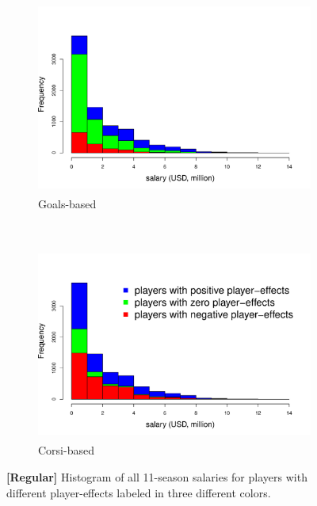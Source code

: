 \begin{figure}[htb!]
	\centering
	\begin{subfigure}[t]{0.5\textwidth}
		\centering
		\includegraphics[height=2.5in]{figures/salaryhist-goals-regular.pdf}
		\caption{Goals-based}
	\end{subfigure}%
	~ 
	\begin{subfigure}[t]{0.5\textwidth}
		\centering
		\includegraphics[height=2.5in]{figures/salaryhist-corsi-regular.pdf}
		\caption{Corsi-based}
	\end{subfigure}
	\caption{\textbf{[Regular]} Histogram of all 11-season salaries for players with different player-effects labeled in three different colors.}
\end{figure}



